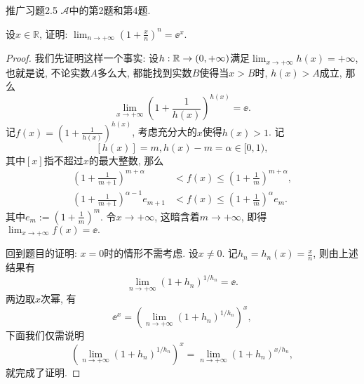 \begin{quizb}
\woe 推广习题2.5 \(\boldsymbol{\mathcal{A}}\)中的第2题和第4题.
\begin{solution}

\end{solution}
\woe 设\(x\in\mathbb{R}\), 证明: \(\lim_{n\rightarrow+\infty}\left(1+\frac{x}{n}\right)^n=\ee^x\).
\begin{proof}
我们先证明这样一个事实: 设\(h:\mathbb{R}\rightarrow(0,+\infty)\)满足\(\lim_{x\rightarrow+\infty}h(x)=+\infty\), 也就是说, 不论实数\(A\)多么大, 都能找到实数\(B\)使得当\(x>B\)时, \(h(x)>A\)成立, 那么\[\lim_{x\rightarrow+\infty}\left(1+\frac{1}{h(x)}\right)^{h(x)}=\ee.\]记\(f(x)=\left(1+\frac{1}{h(x)}\right)^{h(x)}\), 考虑充分大的\(x\)使得\(h(x)>1\). 记\[[h(x)]=m,h(x)-m=\alpha\in[0,1),\]其中\([x]\)指不超过\(x\)的最大整数, 那么\[\begin{split}
\left(1+\frac{1}{m+1}\right)^{m+\alpha}&<f(x)\leqslant\left(1+\frac{1}{m}\right)^{m+\alpha},\\
\left(1+\frac{1}{m+1}\right)^{\alpha-1}e_{m+1}&<f(x)\leqslant\left(1+\frac{1}{m}\right)^\alpha e_{m}.
\end{split}\]其中\(e_m:=\left(1+\frac{1}{m}\right)^m\). 令\(x\rightarrow+\infty\), 这暗含着\(m\rightarrow+\infty\), 即得\(\lim_{x\rightarrow+\infty}f(x)=\ee.\)

回到题目的证明: \(x=0\)时的情形不需考虑. 设\(x\ne 0\). 记\(h_n=h_n(x)=\frac{x}{n}\), 则由上述结果有\[\lim_{n\rightarrow+\infty}\left(1+h_n\right)^{1/h_n}=\ee.\]两边取\(x\)次幂, 有\[\ee^x=\left(\lim_{n\rightarrow+\infty}\left(1+h_n\right)^{1/h_n}\right)^x,\]下面我们仅需说明\[\left(\lim_{n\rightarrow+\infty}\left(1+h_n\right)^{1/h_n}\right)^x=\lim_{n\rightarrow+\infty}\left(1+h_n\right)^{x/h_n},\]就完成了证明.


\end{proof}
\end{quizb}
